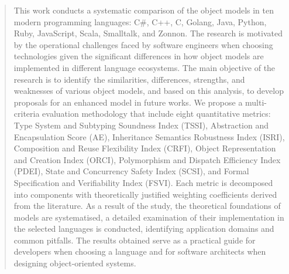 \begin{abstract}

This work conducts a systematic comparison of the object models in ten modern programming languages: C\#, C++, C, Golang, Java, Python, Ruby, JavaScript, Scala, Smalltalk, and Zonnon. The research is motivated by the operational challenges faced by software engineers when choosing technologies given the significant differences in how object models are implemented in different language ecosystems. The main objective of the research is to identify the similarities, differences, strengths, and weaknesses of various object models, and based on this analysis, to develop proposals for an enhanced model in future works. We propose a multi-criteria evaluation methodology that include eight quantitative metrics: Type System and Subtyping Soundness Index (TSSI), Abstraction and Encapsulation Score (AE), Inheritance Semantics Robustness Index (ISRI), Composition and Reuse Flexibility Index (CRFI), Object Representation and Creation Index (ORCI), Polymorphism and Dispatch Efficiency Index (PDEI), State and Concurrency Safety Index (SCSI), and Formal Specification and Verifiability Index (FSVI). Each metric is decomposed into components with theoretically justified weighting coefficients derived from the literature. As a result of the study, the theoretical foundations of models are systematised, a detailed examination of their implementation in the selected languages is conducted, identifying application domains and common pitfalls. The results obtained serve as a practical guide for developers when choosing a language and for software architects when designing object-oriented systems.

\end{abstract}

